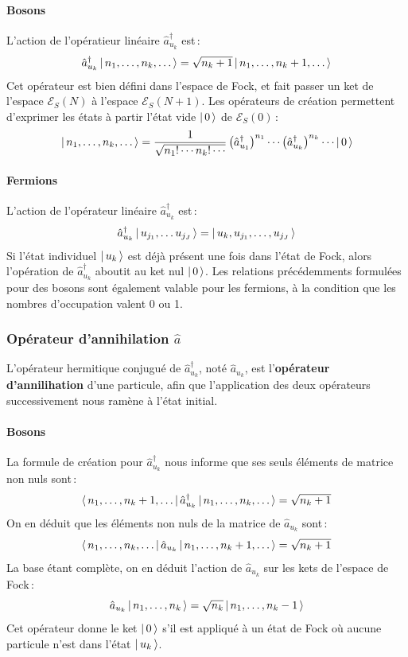            \paragraph{Bosons}

            L’action de l’opératieur linéaire $\hat{a}_{u_k}^{\dagger}$ est :
            \[ \hat{a}_{u_k}^{\dagger} \left| \, n_1, \ldots, n_k, \ldots \, \right> = \sqrt{n_k + 1} \left| \, n_1, \ldots, n_k + 1, \ldots \, \right> \]   
            Cet opérateur est bien défini dans l’espace de Fock, et fait passer un ket de l’espace $\mathcal{E}_{S}(N)$ à l’espace $\mathcal{E}_{S}(N+1)$. Les opérateurs de création permettent d’exprimer les états à partir l’état vide $\left| \, 0 \, \right>$ de $\mathcal{E}_{S}(0)$ :
            \[ \left| \, n_1, \ldots, n_k, \ldots \, \right> = \frac{1}{\sqrt{n_1!\cdots n_k!\cdots}} \left(\hat{a}_{u_1}^{\dagger}\right)^{n_1} \cdots \left(\hat{a}_{u_k}^{\dagger}\right)^{n_k}\cdots \left| \, 0 \, \right> \]

            \paragraph{Fermions}

            L’action de l’opérateur linéaire $\hat{a}_{u_k}^{\dagger}$ est :
            \[ \hat{a}_{u_k}^{\dagger} \left| \, u_{j_1}, \ldots u_{j_J} \, \right> = \left| \, u_k, u_{j_1}, \ldots, u_{j_J} \, \right> \]   
            Si l’état individuel $\left| \, u_k \, \right>$ est déjà présent une fois dans l’état de Fock, alors l’opération de $\hat{a}_{u_k}^{\dagger}$ aboutit au ket nul $\left| \, 0 \, \right>$. Les relations précédemments formulées pour des bosons sont également valable pour les fermions, à la condition que les nombres d’occupation valent 0 ou 1.

        \subsubsection{Opérateur d’annihilation $\hat{a}$}

        L’opérateur hermitique conjugué de $\hat{a}_{u_k}^{\dagger}$, noté $\hat{a}_{u_k}$, est l’\textbf{opérateur d’annilihation} d’une particule, afin que l’application des deux opérateurs successivement nous ramène à l’état initial.

            \paragraph{Bosons}

            La formule de création pour $\hat{a}_{u_k}^{\dagger}$ nous informe que ses seuls éléments de matrice non nuls sont :
            \[ \left< \, n_1, \ldots, n_k + 1, \ldots \, \right| \hat{a}_{u_k}^{\dagger} \left| \, n_1, \ldots, n_k, \ldots \, \right> = \sqrt{n_k + 1} \]   
            On en déduit que les éléments non nuls de la matrice de $\hat{a}_{u_k}$ sont :
            \[ \left< \, n_1, \ldots, n_k, \ldots \, \right| \hat{a}_{u_k} \left| \, n_1, \ldots, n_k + 1, \ldots \, \right> = \sqrt{n_k + 1} \]  
            La base étant complète, on en déduit l’action de $\hat{a}_{u_k}$ sur les kets de l’espace de Fock :
            \[ \hat{a}_{u_k} \left| \, n_1, \ldots, n_k \, \right> = \sqrt{n_k} \left| \, n_1, \ldots, n_k - 1 \, \right> \]    
            Cet opérateur donne le ket $\left| \, 0 \, \right>$ s’il est appliqué à un état de Fock où aucune particule n’est dans l’état $\left| \, u_k \, \right>$.

